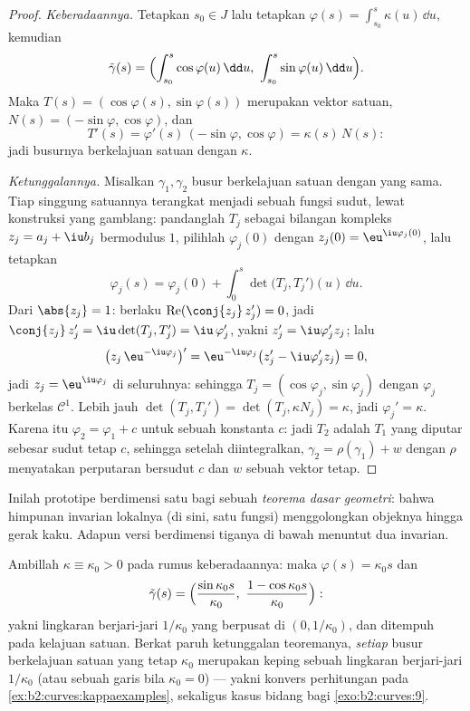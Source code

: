 \begin{proof}
\emph{Keberadaannya.} Tetapkan $s_0 \in J$ lalu tetapkan $\varphi(s) =
\int_{s_0}^s \kappa(u)\,\dd u$, kemudian
\[
\tilde\gamma(s) = \Bigl(\int_{s_0}^s \cos\varphi(u)\,\dd u,\
\int_{s_0}^s \sin\varphi(u)\,\dd u\Bigr).
\]
Maka $T(s) = (\cos\varphi(s), \sin\varphi(s))$ merupakan vektor satuan,
$N(s) = (-\sin\varphi, \cos\varphi)$, dan
\[
T'(s) = \varphi'(s)\,(-\sin\varphi, \cos\varphi)
= \kappa(s)\,N(s) :
\]
jadi busurnya berkelajuan satuan dengan  $\kappa$.

\emph{Ketunggalannya.} Misalkan $\gamma_1, \gamma_2$ busur berkelajuan satuan dengan
\omterm{thm:b2:curves:frenet2d}{kelengkungan} yang sama. Tiap singgung satuannya terangkat menjadi sebuah fungsi
sudut, lewat konstruksi yang gamblang: pandanglah $T_j$ sebagai
bilangan kompleks $z_j = a_j + \iu b_j$ bermodulus $1$, pilihlah
$\varphi_j(0)$ dengan $z_j(0) = \eu^{\iu\varphi_j(0)}$, lalu tetapkan
\[
\varphi_j(s) = \varphi_j(0) + \int_0^s\det\bigl(T_j,
T_j'\bigr)(u)\,\dd u .
\]
Dari $\abs{z_j} = 1$: berlaku $\operatorname{Re}(\conj{z_j}\,z_j') =
0$, jadi $\conj{z_j}\,z_j' = \iu\det(T_j, T_j') =
\iu\,\varphi_j'$, yakni $z_j' = \iu\varphi_j'z_j$; lalu
\[
\bigl(z_j\,\eu^{-\iu\varphi_j}\bigr)'
= \eu^{-\iu\varphi_j}\bigl(z_j' - \iu\varphi_j'z_j\bigr) = 0,
\]
jadi $z_j = \eu^{\iu\varphi_j}$ di seluruhnya: sehingga $T_j =
(\cos\varphi_j, \sin\varphi_j)$ dengan $\varphi_j$ berkelas
$\mathcal C^1$. Lebih jauh $\det(T_j, T_j') = \det(T_j,
\kappa N_j) = \kappa$, jadi $\varphi_j' = \kappa$. Karena itu $\varphi_2 = \varphi_1 + c$ untuk sebuah
konstanta $c$: jadi $T_2$ adalah $T_1$ yang diputar sebesar sudut tetap $c$, sehingga
setelah diintegralkan, $\gamma_2 = \rho(\gamma_1) + w$ dengan $\rho$ menyatakan
perputaran bersudut $c$ dan $w$ sebuah vektor tetap.
\end{proof}

\begin{remark}
Inilah prototipe berdimensi satu bagi sebuah \emph{teorema
dasar geometri}: bahwa himpunan  invarian lokalnya (di sini, satu
fungsi) menggolongkan objeknya hingga gerak kaku. Adapun versi
berdimensi tiganya di bawah menuntut dua invarian.
\end{remark}

\begin{example}\label{ex:b2:curves:constantkappa}
Ambillah $\kappa \equiv \kappa_0 > 0$ pada rumus keberadaannya:
maka $\varphi(s) = \kappa_0 s$ dan
\[
\tilde\gamma(s) = \Bigl(\frac{\sin\kappa_0s}{\kappa_0},\
\frac{1 - \cos\kappa_0s}{\kappa_0}\Bigr) :
\]
yakni lingkaran berjari-jari $1/\kappa_0$ yang berpusat di $(0,
1/\kappa_0)$, dan ditempuh pada kelajuan satuan. Berkat paruh ketunggalan
teoremanya, \emph{setiap} busur berkelajuan satuan yang  tetap
$\kappa_0$ merupakan keping sebuah lingkaran berjari-jari
$1/\kappa_0$ (atau sebuah garis bila $\kappa_0 = 0$) --- yakni konvers
perhitungan pada \cref{ex:b2:curves:kappaexamples}, sekaligus
kasus bidang bagi \cref{exo:b2:curves:9}.
\end{example}

